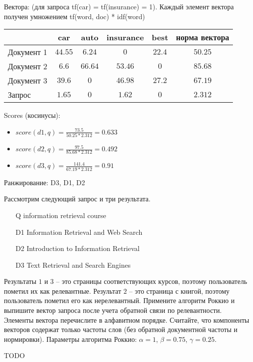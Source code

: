 \begin{solution}
Вектора: (для запроса tf(car) = tf(insurance) = 1). Каждый элемент вектора получен умножением tf(word, doc) * idf(word)
\begin{table}[ht!]
\centering
\begin{tabular}{lccccc}
 & car & auto & insurance & best & норма вектора \\
 \hline
 Документ 1 & $44.55$ & $6.24$ & $0$ & $22.4$ & $50.25$\\
 Документ 2 & $6.6$ & $66.64$ & $53.46$ & $0$ & $85.68$ \\
 Документ 3 & $39.6$ & $0$ & $46.98$ & $27.2$ & $67.19$ \\
 Запрос     & $1.65$ & $0$ & $1.62$ & $0$ & $2.312$\\ 
\end{tabular}
\end{table}

Scores (косинусы):
\begin{itemize}
	\item $score(d1, q) = \frac{73.5}{50.25 * 2.312} = 0.633$
	\item $score(d2, q) = \frac{97.5}{85.68 * 2.312} = 0.492$
	\item $score(d3, q) = \frac{141.4}{67.19 * 2.312} = 0.91$
\end{itemize}
Ранжирование: D3, D1, D2
\end{solution}

\begin{task}[5]
Рассмотрим следующий запрос и три результата.
\begin{itemize}
	\item[Q] information retrieval course
	\item[D1] Information Retrieval and Web Search
	\item[D2] Introduction to Information Retrieval
	\item[D3] Text Retrieval and Search Engines
\end{itemize}
Результаты $1$ и $3$ – это страницы соответствующих курсов, поэтому пользователь
пометил их как релевантные. Результат $2$ – это страница с книгой, поэтому пользователь
пометил его как нерелевантный.
Примените алгоритм Роккио и выпишите вектор запроса после учета обратной
связи по релевантности. Элементы вектора перечислите в алфавитном порядке.
Считайте, что компоненты векторов содержат только частоты слов (без обратной
документной частоты и нормировки). Параметры алгоритма Роккио: $\alpha = 1$, $\beta =
0.75$, $\gamma = 0.25$.
\end{task}
\begin{solution}
TODO
\end{solution}

